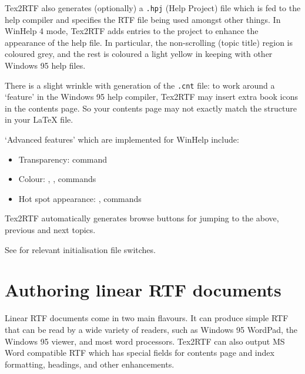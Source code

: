 Tex2RTF also generates (optionally) a {\tt .hpj} (Help Project) file which is
fed to the help compiler and specifies the RTF file being used amongst
other things. In WinHelp 4 mode, Tex2RTF adds entries to the project
to enhance the appearance of the help file. In particular, the
non-scrolling (topic title) region is coloured grey, and the rest
is coloured a light yellow in keeping with other Windows 95 help
files.


There is a slight wrinkle with generation of the {\tt .cnt} file:
to work around a `feature' in the Windows 95 help compiler, Tex2RTF may insert
extra book icons in the contents page. So your contents page
may not exactly match the structure in your LaTeX file.

`Advanced features' which are implemented for WinHelp include:

\begin{itemize}\itemsep=0pt
\item Transparency:  command
\item Colour: , ,  commands
\item Hot spot appearance: ,  commands
\end{itemize}

Tex2RTF automatically generates browse buttons for jumping to the
above, previous and next topics. 

See  for
relevant initialisation file switches.

\section{Authoring linear RTF documents}%

Linear RTF documents come in two main flavours. It can produce simple
RTF that can be read by a wide variety of readers, such as
Windows 95 WordPad, the Windows 95 viewer, and most word processors.
Tex2RTF can also output MS Word compatible RTF which has special
fields for contents page and index formatting, headings, and
other enhancements.

